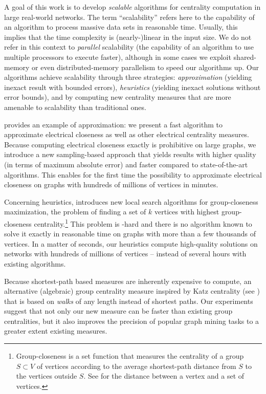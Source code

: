 A goal of this work is to develop \emph{scalable}
algorithms for centrality computation in large real-world networks.
The term \enquote{scalability}
refers here to the capability of an algorithm to process massive data sets in
reasonable time. Usually, this implies that the time complexity is (nearly-)linear
in the input size. We do not refer in this context to \emph{parallel} scalability
(\ie the capability of an algorithm to use multiple processors to execute faster),
although in some cases we exploit shared-memory or even distributed-memory
parallelism to speed our algorithms up.
Our algorithms achieve scalability through three strategies: \emph{approximation}
(\ie yielding inexact result with bounded errors),
\emph{heuristics} (\ie yielding inexact solutions without error bounds), and by
 computing new centrality
measures that are more amenable to scalability than traditional ones.

 provides an example of approximation: we present
a fast algorithm to approximate electrical closeness as well as other electrical
centrality measures.
Because computing electrical closeness exactly is prohibitive
on large graphs, we introduce a new sampling-based approach that yields results
with higher quality (in terms of maximum absolute error) and  faster
compared to state-of-the-art algorithms. This enables for the first time the
possibility to approximate electrical closeness on graphs with hundreds of
millions of vertices in minutes.

Concerning heuristics,  introduces
new local search algorithms for group-closeness maximization, \ie
the problem of finding a set of $k$ vertices with highest group-closeness
centrality.\footnote{Group-closeness is a set function that measures
the centrality of a group $S\subset V$ of vertices according to
the average shortest-path distance from $S$ to the vertices outside $S$.
See  for the distance between a vertex and a set of
vertices.} This problem is \np-hard and there is no algorithm known to
solve it exactly in reasonable time on graphs with more than a few thousands of
vertices.
In a matter of seconds, our heuristics compute high-quality solutions on
networks with hundreds of millions of vertices -- instead of several hours with
existing algorithms.

Because shortest-path based measures are inherently expensive to compute,
 an alternative (algebraic) group
centrality measure inspired by Katz centrality (see ) that is
based on \emph{walks} of any length instead of shortest paths. Our experiments
suggest that not only our new measure can be 
faster than existing group centralities, but it also improves the precision of
popular graph mining tasks to a greater extent  existing measures.

